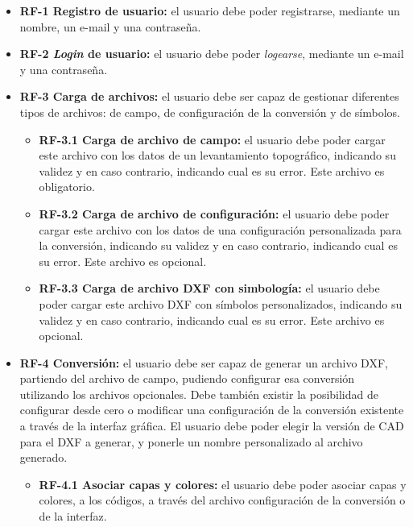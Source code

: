 \begin{itemize}
\item \textbf{RF-1 Registro de usuario: }el usuario debe poder 		registrarse, mediante un nombre, un e-mail y una contraseña.

\item \textbf{RF-2 \emph{Login} de usuario: }el usuario debe poder 	\emph{logearse}, mediante un e-mail y una contraseña.



\item \textbf{RF-3 Carga de archivos: }el usuario debe ser capaz de gestionar diferentes tipos de archivos: de campo, de configuración de la conversión y de símbolos.

\begin{itemize}
\item \textbf{RF-3.1 Carga de archivo de campo: }el usuario debe poder cargar este archivo con los datos de un levantamiento topográfico, indicando su validez y en caso contrario, indicando cual es su error. Este archivo es obligatorio.

\item \textbf{RF-3.2 Carga de archivo de configuración: }el usuario debe poder cargar este archivo con los datos de una configuración personalizada para la conversión, indicando su validez y en caso contrario, indicando cual es su error. Este archivo es opcional.

\item \textbf{RF-3.3 Carga de archivo DXF con simbología: }el usuario debe poder cargar este archivo DXF con símbolos personalizados, indicando su validez y en caso contrario, indicando cual es su error. Este archivo es opcional.
	
\end{itemize}

\item \textbf{RF-4 Conversión: }el usuario debe ser capaz de generar un archivo DXF, partiendo del archivo de campo, pudiendo configurar esa conversión utilizando los archivos opcionales. Debe también existir la posibilidad de configurar desde cero o modificar una configuración de la conversión existente a través de la interfaz gráfica. El usuario debe poder elegir la versión de CAD para el DXF a generar, y ponerle un nombre personalizado al archivo generado.

\begin{itemize}

\item \textbf{RF-4.1 Asociar capas y colores: }el usuario debe poder asociar capas y colores, a los códigos, a través del archivo configuración de la conversión o de la interfaz. 


\end{itemize}
\end{itemize}
